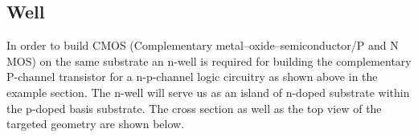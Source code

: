 \subsection{Well}
In order to build CMOS (Complementary metal–oxide–semiconductor/P and N MOS) on the same substrate an n-well is required for building the complementary P-channel transistor for a n-p-channel logic circuitry as shown above in the example section.
The n-well will serve us as an island of n-doped substrate within the p-doped basis substrate.
The cross section as well as the top view of the targeted geometry are shown below.

\begin{center}
	\begin{tikzpicture}[node distance = 3cm, auto, thick,scale=0.3, every node/.style={transform shape}]
		
	\end{tikzpicture}
	\begin{tikzpicture}[node distance = 3cm, auto, thick,scale=0.3, every node/.style={transform shape}]
		
	\end{tikzpicture}
\end{center}

